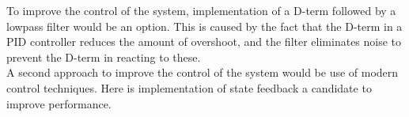 \documentclass[../../main]{subfiles}
\begin{document}
To improve the control of the system, implementation of a D-term followed by a lowpass filter would be an option. This is caused by the fact that the D-term in a PID controller reduces the amount of overshoot, and the filter eliminates noise to prevent the D-term in reacting to these.\\
A second approach to improve the control of the system would be use of modern control techniques. Here is implementation of state feedback a candidate to improve performance.
\end{document}
